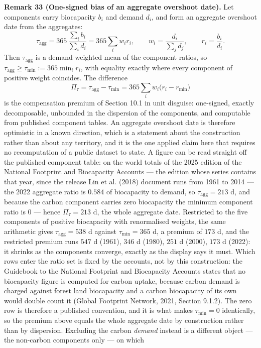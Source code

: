 \documentclass[11pt]{article}
\begin{document}
\textbf{Remark 33 (One-signed bias of an aggregate overshoot date).} Let components carry biocapacity
\(b_i\) and demand \(d_i\), and form an aggregate overshoot date from the aggregates:
\[ \tau_{\mathrm{agg}}=365\,\frac{\sum_ib_i}{\sum_id_i}=365\sum_iw_ir_i, \qquad w_i=\frac{d_i}{\sum_jd_j}, \qquad r_i=\frac{b_i}{d_i}. \]
Then \(\tau_{\mathrm{agg}}\) is a demand-weighted mean of the component ratios, so
\(\tau_{\mathrm{agg}}\ge\tau_{\min}:=365\min_ir_i\), with equality exactly where every component of
positive weight coincides. The difference
\[ \Pi_\tau=\tau_{\mathrm{agg}}-\tau_{\min}=365\sum_iw_i\bigl(r_i-r_{\min}\bigr) \]
is the compensation premium of Section 10.1 in unit disguise: one-signed, exactly decomposable,
unbounded in the dispersion of the components, and computable from published component tables. An
aggregate overshoot date is therefore optimistic in a known direction, which is a statement about
the construction rather than about any territory, and it is the one applied claim here that requires
no recomputation of a public dataset to state. A figure can be read straight off the published component table: on the world totals of the 2025 edition of the National Footprint and Biocapacity Accounts --- the edition whose series contains that year, since the release Lin et al. (2018) document runs from 1961 to 2014 --- the 2022 aggregate ratio is \(0.584\) of biocapacity to demand, so \(\tau_{\mathrm{agg}} = 213\) d, and because the carbon component carries zero
biocapacity the minimum component ratio is \(0\) --- hence \(\Pi_\tau = 213\) d, the whole aggregate date.
Restricted to the five components of positive biocapacity with renormalised weights, the same arithmetic
gives \(\tau_{\mathrm{agg}} = 538\) d against \(\tau_{\min} = 365\) d, a premium of \(173\) d, and the
restricted premium runs \(547\) d (1961), \(346\) d (1980), \(251\) d (2000), \(173\) d (2022): it shrinks as the
components converge, exactly as the display says it must. Which rows enter the ratio set is fixed by the accounts, not by this
construction: the Guidebook to the National Footprint and Biocapacity Accounts states that no biocapacity
figure is computed for carbon uptake, because carbon demand is charged against forest land biocapacity and a
carbon biocapacity of its own would double count it (Global Footprint Network, 2021, Section 9.1.2). The zero
row is therefore a published convention, and it is what makes \(\tau_{\min} = 0\) identically, so the premium
above equals the whole aggregate date by construction rather than by dispersion. Excluding the carbon
\emph{demand} instead is a different object --- the non-carbon components only --- on which
\end{document}
